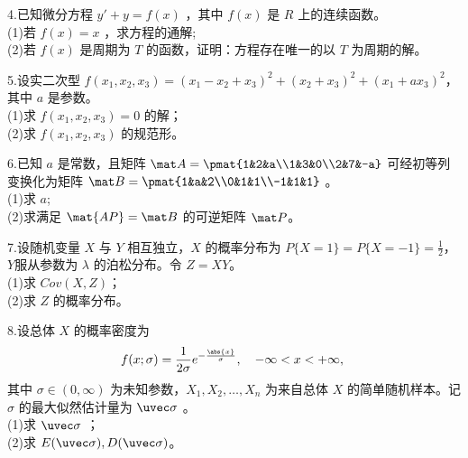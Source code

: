 4.已知微分方程 $y'+y=f(x)$ ，其中 $f(x)$ 是 $R$ 上的连续函数。\\
(1)若 $f(x)=x$ ，求方程的通解;\\
(2)若 $f(x)$ 是周期为 $T$ 的函数，证明：方程存在唯一的以 $T$ 为周期的解。

5.设实二次型 $f(x_1,x_2,x_3)=(x_1-x_2+x_3)^2+(x_2+x_3)^2+(x_1+ax_3)^2$，其中 $a$ 是参数。\\
(1)求 $f(x_1,x_2,x_3)=0$ 的解；\\
(2)求 $f(x_1,x_2,x_3)$ 的规范形。

6.已知 $a$ 是常数，且矩阵 $ \mat A=\pmat{1&2&a\\1&3&0\\2&7&-a}$ 可经初等列变换化为矩阵 $\mat B=\pmat{1&a&2\\0&1&1\\-1&1&1}$ 。\\
(1)求 $a$;\\
(2)求满足 $\mat {AP}=\mat B$ 的可逆矩阵 $\mat P$。

7.设随机变量 $X$ 与 $Y$ 相互独立，$X$ 的概率分布为 $P\{X=1\}=P\{X=-1\}=\frac{1}{2}$，  $Y$服从参数为 $\lambda$ 的泊松分布。令 $Z=XY$。\\
(1)求 $Cov(X,Z)$；\\
(2)求 $Z$ 的概率分布。

8.设总体 $X$ 的概率密度为
$$f(x;\sigma)=\frac{1}{2\sigma}e^{-\frac{\abs{x}}{\sigma}},\quad  -\infty<x<+\infty,~$$
其中 $\sigma \in (0,\infty)$ 为未知参数，$X_1,X_2,\dots,X_n$ 为来自总体 $X$ 的简单随机样本。记 $\sigma$ 的最大似然估计量为 $\uvec \sigma$ 。\\
(1)求  $\uvec \sigma$ ；\\
(2)求 $E(\uvec \sigma),D(\uvec \sigma)$。
